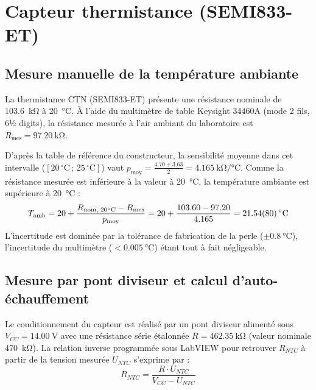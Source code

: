 \section{Capteur thermistance (SEMI833-ET)}

\subsection{Mesure manuelle de la température ambiante}
\label{subsec:ntc_ambiante}

La thermistance CTN (SEMI833-ET) présente une résistance nominale de \qty{103.6}{\kilo\ohm} à \qty{20}{\degreeCelsius}. 
À l'aide du multimètre de table Keysight 34460A (mode 2 fils, 6½ digits), la résistance mesurée à l'air ambiant du laboratoire est $R_{\text{mes}} = \qty{97.20}{\kilo\ohm}$.

D'après la table de référence du constructeur, la sensibilité moyenne dans cet intervalle ($[20\,^\circ\text{C}\,;\,25\,^\circ\text{C}]$) vaut $p_{\text{moy}} = \frac{4.70 + 3.63}{2} = \qty{4.165}{\kilo\ohm\per\degreeCelsius}$. Comme la résistance mesurée est inférieure à la valeur à \qty{20}{\degreeCelsius}, la température ambiante est supérieure à \qty{20}{\degreeCelsius} :
\begin{equation}
    T_{\text{amb}} = 20 + \frac{R_{\text{nom, } 20^\circ\text{C}} - R_{\text{mes}}}{p_{\text{moy}}} = 20 + \frac{103.60 - 97.20}{4.165} = \mathbf{\qty{21.54 \pm 0.80}{\degreeCelsius}}
\end{equation}
L'incertitude est dominée par la tolérance de fabrication de la perle ($\pm \qty{0.8}{\degreeCelsius}$), l'incertitude du multimètre ($< \qty{0.005}{\degreeCelsius}$) étant tout à fait négligeable.

\subsection{Mesure par pont diviseur et calcul d'auto-échauffement}
\label{subsec:ntc_pont}

Le conditionnement du capteur est réalisé par un pont diviseur alimenté sous $V_{CC} = \qty{14.00}{\volt}$ avec une résistance série étalonnée $R = \qty{462.35}{\kilo\ohm}$ (valeur nominale \qty{470}{\kilo\ohm}). La relation inverse programmée sous LabVIEW pour retrouver $R_{NTC}$ à partir de la tension mesurée $U_{NTC}$ s'exprime par :
\begin{equation}
    R_{NTC} = \frac{R \cdot U_{NTC}}{V_{CC} - U_{NTC}}
    \label{eq:formule_rntc}
\end{equation}

